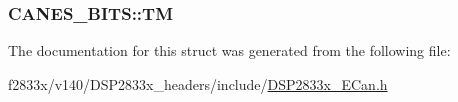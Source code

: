 \subsubsection[{T\+M}]{ C\+A\+N\+E\+S\+\_\+\+B\+I\+T\+S\+::\+T\+M}\label{struct_c_a_n_e_s___b_i_t_s_a7b204c60a228a2526e7cdd119225a8ea}


The documentation for this struct was generated from the following file\+:\begin{DoxyCompactItemize}
\item 
f2833x/v140/\+D\+S\+P2833x\+\_\+headers/include/\hyperlink{_d_s_p2833x___e_can_8h}{D\+S\+P2833x\+\_\+\+E\+Can.\+h}\end{DoxyCompactItemize}

